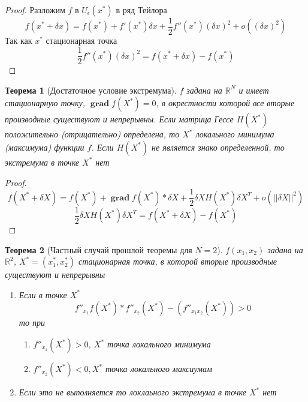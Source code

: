 \documentclass[14pt]{extarticle}
\newtheorem{theorem}{Теорема}
\DeclareMathOperator{\grad}{\textbf{grad}}
\begin{document}
\begin{proof}
	Разложим $f$ в  $U_{\epsilon}(x^{*})$ в ряд Тейлора
	\begin{equation}
		f(x^{*} + \delta x) = f(x^{*}) + f'(x^{*}) \delta x
		+ \frac{1}{2} f''(x^{*}) (\delta x)^{2} + o((\delta x)^2)
	\end{equation}
	Так как $x^{*}$ стационарная точка
	\begin{equation}
		\frac{1}{2} f''(x^{*})  (\delta x) ^2 = 
		f(x^{*} + \delta x) - f(x^{*})
	\end{equation}
\end{proof}
\begin{theorem}[Достаточное условие экстремума]
	$f$ задана на  $\mathbb{R}^{N}$ и
	имеет стационарную точку, $\grad f(X^{*}) = 0$,
	в окрестности которой все вторые производные существуют
	и непрерывны. Если матрица Гессе $H(X^{*})$ 
	положительно (отрицательно) определена,
	то $X^{*}$ локального минимума (максимума) функции 
	$f$. Если  $H(X^{*})$ не является знако определенной, то
	экстремума в точке $X^{*}$ нет
\end{theorem}
\begin{proof}
	\begin{equation}
		f(X^{*} + \delta X) = f(X^{*}) +
		\grad f(X^{*}) * \delta X +
		\frac{1}{2} \delta X H(X^{*})\delta X^{T} + o(||\delta X||^2)
	\end{equation}
	\begin{equation}
		\frac{1}{2} \delta X H(X^{*}) \delta X^{T} = 
		f(X^{*} + \delta X) - f(X^{*})
	\end{equation}
\end{proof}
\begin{theorem}[Частный случай прошлой теоремы для $N =  2$]
	$f(x_1,x_2)$ задана на $\mathbb{R}^2$, $X^{*} = (x_1^{*},x_2^{*})$ стационарная точка, в которой
	вторые производные существуют и непрерывны
	\begin{enumerate}
		\item Если в точке $X^{*}$
			 \begin{equation}
		f''_{x_1} f(X^{*}) * f''_{x_2}(X^{*}) - (f''_{x_1 x_2} (X^{*})) > 0
			 \end{equation}
			 то при 
			 \begin{enumerate}
			 	\item $f''_{x_1}(X^{*}) > 0$,  $X^{*}$ точка локального минимума
				\item $f''_{x_2}(X^{*}) < 0,X^{*}$ точка локального максиумам
			 \end{enumerate}
	\item Если это не выполняется то локлаьного экстремума в точке $X^{*}$ нет
	\end{enumerate}
\end{theorem}
\end{document}
